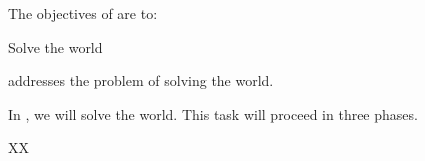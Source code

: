 \addtocounter{wpno}{1}
\begin{Workpackage}{\thewpno}
\WPTitle{\wpname{\thewpno}}


\begin{WPObjectives}
The objectives of \theWP{} are to:
\begin{compactitem}
\item Solve the world
\end{compactitem}
\end{WPObjectives}

\begin{WPDescription}
\theWP{} addresses the problem of solving the world.
\end{WPDescription}

\begin{Task}

\TaskResults{%
}
\TaskHeader{}

In \theTask, we will solve the world. 
This task will proceed in three phases. 
\end{Task}



\begin{WPDeliverables}
  \begin{compactitem}
    \item XX
\end{compactitem}
\end{WPDeliverables}
\end{Workpackage}
